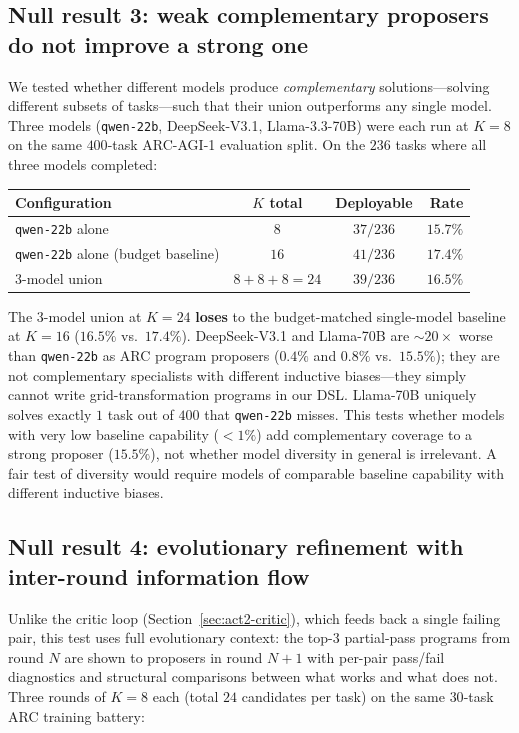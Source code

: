 \documentclass[11pt]{amsart}
\newcommand\1{{\mathds{1}}}
\theoremstyle{definition}
\theoremstyle{remark}
\numberwithin{equation}{section}
\begin{document}
\subsection{Null result 3: weak complementary proposers do not improve a strong one}\label{sec:act2-heterogeneous}

We tested whether different models produce \emph{complementary} solutions---solving different subsets of tasks---such that their union outperforms any single model.
Three models (\texttt{qwen-22b}, DeepSeek-V3.1, Llama-3.3-70B) were each run at $K\!=\!8$ on the same $400$-task ARC-AGI-1 evaluation split.
On the $236$ tasks where all three models completed:

\begin{center}\small
\begin{tabular}{lccr}
\toprule
Configuration & $K$ total & Deployable & Rate \\
\midrule
\texttt{qwen-22b} alone & $8$ & $37/236$ & $15.7\%$ \\
\texttt{qwen-22b} alone (budget baseline) & $16$ & $41/236$ & $17.4\%$ \\
$3$-model union & $8{+}8{+}8{=}24$ & $39/236$ & $16.5\%$ \\
\bottomrule
\end{tabular}
\end{center}

The $3$-model union at $K\!=\!24$ \textbf{loses} to the budget-matched single-model baseline at $K\!=\!16$ ($16.5\%$ vs.\ $17.4\%$).
DeepSeek-V3.1 and Llama-70B are $\sim\!20\times$ worse than \texttt{qwen-22b} as ARC program proposers ($0.4\%$ and $0.8\%$ vs.\ $15.5\%$); they are not complementary specialists with different inductive biases---they simply cannot write grid-transformation programs in our DSL.
Llama-70B uniquely solves exactly $1$ task out of $400$ that \texttt{qwen-22b} misses.
This tests whether models with very low baseline capability ($<1\%$) add complementary coverage to a strong proposer ($15.5\%$), not whether model diversity in general is irrelevant.
A fair test of diversity would require models of comparable baseline capability with different inductive biases.

\subsection{Null result 4: evolutionary refinement with inter-round information flow}\label{sec:act2-evolutionary}

Unlike the critic loop (Section~\ref{sec:act2-critic}), which feeds back a single failing pair, this test uses full evolutionary context: the top-$3$ partial-pass programs from round $N$ are shown to proposers in round $N{+}1$ with per-pair pass/fail diagnostics and structural comparisons between what works and what does not.
Three rounds of $K\!=\!8$ each (total $24$ candidates per task) on the same $30$-task ARC training battery:
\end{document}
